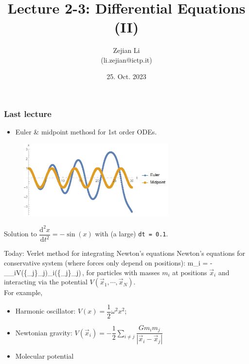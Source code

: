 \documentclass[11pt,aspectratio=169,handout]{beamer}
\begin{document}
	
\author{Zejian Li \\(li.zejian@ictp.it)}
\title{Lecture 2-3: Differential Equations (II)}
\date{25. Oct. 2023}


\begin{frame}[plain]
	\maketitle
\end{frame}


\begin{frame}
\frametitle{Last lecture}

\begin{itemize}
	\item Euler \& midpoint methosd for 1st order ODEs.
\end{itemize}
\begin{figure}
	\includegraphics[width=0.7\textwidth]{fig/euler-vs-mid}
\end{figure}
\begin{center}
	Solution to $\dfrac{\mathrm{d}^2 x}{\mathrm{d}t^2} = -\sin(x)$ with (a large) \texttt{dt = 0.1}.
\end{center}
\end{frame}

\begin{frame}{Today: Verlet method for integrating Newton's equations}
	Newton's equations for conservative system (where forces only depend on positions):
	\bea
		m_i  = -\vec{\nabla}_{_i}V(\{_j\}_j)\equiv {}_i(\{_j\}_j)\,,
	\eea
	for particles with masses $m_i$ at positions $\vec{x}_i$ and interacting via the potential $V(\vec{x}_1,\cdots,\vec{x}_N)$.\\
	For example,\pause
	\begin{itemize}[<+->]
		\item Harmonic oscillator: $V(x) = \dfrac{1}{2}\omega^2 x^2$;
		\item Newtonian gravity: $V({\vec{x}_i}) = -\dfrac{1}{2}\sum_{i\neq j} \dfrac{G m_i m_j}{| \vec{x}_i - \vec{x}_j |}$
		\item Molecular potential
	\end{itemize}
\end{frame}
\end{document}
